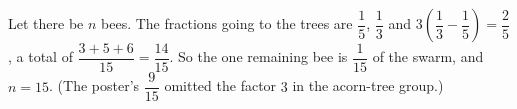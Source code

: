 Let there be $n$ bees. The fractions going to the trees are $\dfrac{1}{5}$, $\dfrac{1}{3}$ and $3\left(\dfrac{1}{3}-\dfrac{1}{5}\right)=\dfrac{2}{5}$, a total of $\dfrac{3+5+6}{15}=\dfrac{14}{15}$. So the one remaining bee is $\dfrac{1}{15}$ of the swarm, and $n=\boxed{15}$. (The poster's $\dfrac{9}{15}$ omitted the factor $3$ in the acorn-tree group.)

